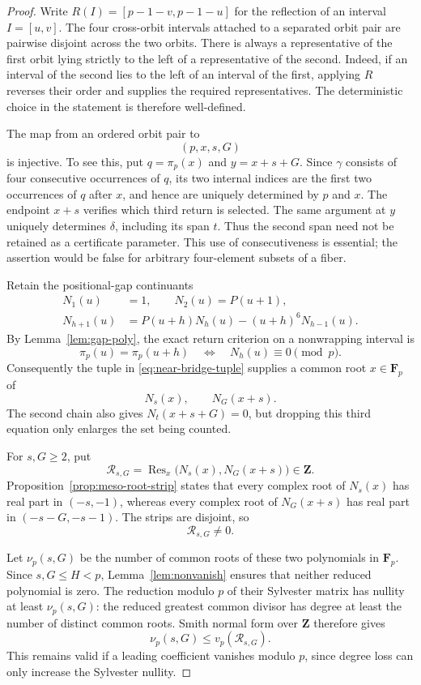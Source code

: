 \begin{proof}
Write \(R(I)=[p-1-v,p-1-u]\) for the reflection of an interval
\(I=[u,v]\).  The four cross-orbit intervals attached to a separated
orbit pair are pairwise disjoint across the two orbits.  There is always
a representative of the first orbit lying strictly to the left of a
representative of the second.  Indeed, if an interval of the second lies
to the left of an interval of the first, applying \(R\) reverses their
order and supplies the required representatives.  The deterministic
choice in the statement is therefore well-defined.

The map from an ordered orbit pair to
\begin{equation}
 (p,x,s,G)
 \label{eq:near-bridge-tuple}
\end{equation}
is injective.  To see this, put \(q=\pi_p(x)\) and
\(y=x+s+G\).  Since \(\gamma\) consists of four consecutive occurrences
of \(q\), its two internal indices are the first two occurrences of \(q\)
after \(x\), and hence are uniquely determined by \(p\) and \(x\).
The endpoint \(x+s\) verifies which third return is selected.  The same
argument at \(y\) uniquely determines \(\delta\), including its span
\(t\).  Thus the second span need not be retained as a certificate
parameter.  This use of consecutiveness is essential; the assertion would
be false for arbitrary four-element subsets of a fiber.

Retain the positional-gap continuants
\[
 \begin{aligned}
 N_1(u)&=1,\qquad N_2(u)=P(u+1),\\
 N_{h+1}(u)&=P(u+h)N_h(u)-(u+h)^6N_{h-1}(u).
 \end{aligned}
\]
By Lemma~\ref{lem:gap-poly}, the exact return criterion on a
nonwrapping interval is
\[
 \pi_p(u)=\pi_p(u+h)\quad\Longleftrightarrow\quad
 N_h(u)\equiv0\pmod p.
\]
Consequently the tuple in \eqref{eq:near-bridge-tuple} supplies a common
root \(x\in\mathbf F_p\) of
\[
 N_s(x),\qquad N_G(x+s).
\]
The second chain also gives \(N_t(x+s+G)=0\), but dropping this third
equation only enlarges the set being counted.

For \(s,G\ge2\), put
\[
 \mathcal R_{s,G}
 =\operatorname{Res}_x\bigl(N_s(x),N_G(x+s)\bigr)\in\mathbf Z.
\]
Proposition~\ref{prop:meso-root-strip} states that every complex root of
\(N_s(x)\) has real part in \((-s,-1)\), whereas every complex root of
\(N_G(x+s)\) has real part in \((-s-G,-s-1)\).  The strips are disjoint,
so
\[
 \mathcal R_{s,G}\ne0.
\]

Let \(\nu_p(s,G)\) be the number of common roots of these two polynomials
in \(\mathbf F_p\).  Since \(s,G\le H<p\),
Lemma~\ref{lem:nonvanish} ensures that neither reduced polynomial is zero.
The reduction modulo \(p\) of their Sylvester matrix has nullity at least
\(\nu_p(s,G)\): the reduced greatest common divisor has degree at least
the number of distinct common roots.  Smith normal form over \(\mathbf Z\)
therefore gives
\begin{equation}
 \nu_p(s,G)\le v_p(\mathcal R_{s,G}).
 \label{eq:near-bridge-smith}
\end{equation}
This remains valid if a leading coefficient vanishes modulo \(p\), since
degree loss can only increase the Sylvester nullity.


\end{proof}
